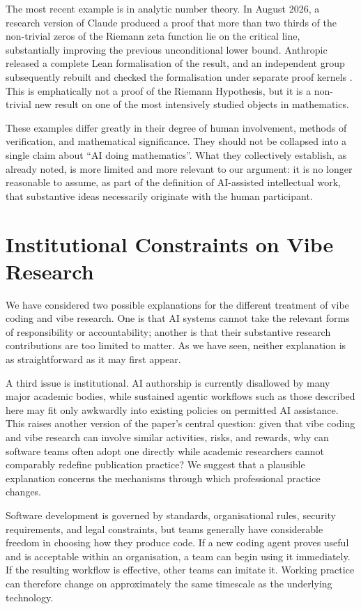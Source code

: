 \documentclass[12pt]{article}
\begin{document}
The most recent example is in analytic number theory. In August 2026, a research version of Claude produced a proof that more than two thirds of the non-trivial zeros of the Riemann zeta function lie on the critical line, substantially improving the previous unconditional lower bound. Anthropic released a complete Lean formalisation of the result, and an independent group subsequently rebuilt and checked the formalisation under separate proof kernels \citep{claude2026zeta,riemannlabs2026zeta}. This is emphatically not a proof of the Riemann Hypothesis, but it is a non-trivial new result on one of the most intensively studied objects in mathematics.

These examples differ greatly in their degree of human involvement, methods of verification, and mathematical significance. They should not be collapsed into a single claim about ``AI doing mathematics''. What they collectively establish, as already noted, is more limited and more relevant to our argument: it is no longer reasonable to assume, as part of the definition of AI-assisted intellectual work, that substantive ideas necessarily originate with the human participant.

\section{Institutional Constraints on Vibe Research}

We have considered two possible explanations for the different treatment of vibe coding and vibe research. One is that AI systems cannot take the relevant forms of responsibility or accountability; another is that their substantive research contributions are too limited to matter. As we have seen, neither explanation is as straightforward as it may first appear.

A third issue is institutional. AI authorship is currently disallowed by many major academic bodies, while sustained agentic workflows such as those described here may fit only awkwardly into existing policies on permitted AI assistance. This raises another version of the paper's central question: given that vibe coding and vibe research can involve similar activities, risks, and rewards, why can software teams often adopt one directly while academic researchers cannot comparably redefine publication practice? We suggest that a plausible explanation concerns the mechanisms through which professional practice changes.

Software development is governed by standards, organisational rules, security requirements, and legal constraints, but teams generally have considerable freedom in choosing how they produce code. If a new coding agent proves useful and is acceptable within an organisation, a team can begin using it immediately. If the resulting workflow is effective, other teams can imitate it. Working practice can therefore change on approximately the same timescale as the underlying technology.
\end{document}
